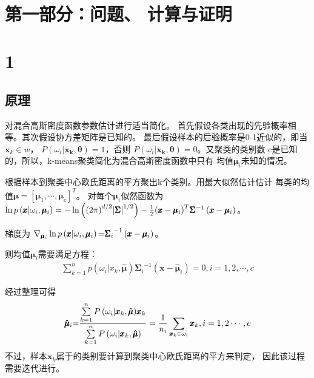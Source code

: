 \documentclass{article}
\title{
    \vspace{2in}
    \textmd{\textbf{\courseName}}\\
    \textmd{\homeworkTitle}\\ %
    \vspace{0.1in}
    \large{\studentName}\\
    \large{\studentId}\\
    \vspace{3in}
}
\begin{document}
\maketitle
\date{}
\pagebreak

\section*{第一部分：问题、 计算与证明}
\section*{1}
\subsection*{原理}
对混合高斯密度函数参数估计进行适当简化。
首先假设各类出现的先验概率相等。其次假设协方差矩阵是已知的。
最后假设样本的后验概率是0-1近似的，即当${\pmb{x}_k} \in w$，
$P\left( {{\omega_i}|\pmb{\pmb{x}_k},\pmb{\theta} } \right) = 1$，否则
$P\left( {{\omega_i}|\pmb{\pmb{x}_k},\pmb{\theta} } \right) = 0$。又聚类的类别数
c是已知的，所以，k-means聚类简化为混合高斯密度函数中只有
均值${\pmb{\mu} _i}$未知的情况。

根据样本到聚类中心欧氏距离的平方聚出k个类别。用最大似然估计估计
每类的均值$\pmb{\mu}  = {\left[ {{\pmb{\mu} _1}, \cdots ,{\pmb{\mu} _c}} \right]^T}$。
对每个${\pmb{\mu} _i}$似然函数为
$\ln p\left( {\pmb{x}|{\omega_i},{\pmb{\mu} _i}} \right) =  
- \ln \left( {{{\left( {2\pi } \right)}^{d/2}}{{\left| \pmb{\Sigma}  \right|}^{1/2}}} 
\right) - {1 \over 2}{\left( {\pmb{x} - {\pmb{\mu} _i}} \right)^T}{\pmb{\Sigma} ^{ - 1}}
\left( {\pmb{x} - {\pmb{\mu} _i}} \right)$。

梯度为
${\nabla _{{\pmb{\mu} _i}}}\ln p\left( {\pmb{x}|{\omega_i},{\pmb{\mu} _i}} \right)
{\rm{ = }}{\pmb{\Sigma} _i}^{ - 1}\left( {\pmb{x} - {\pmb{\mu} _i}} \right)$。

则均值${\pmb{\mu} _i}$需要满足方程：
\begin{align*}
	\sum\limits_{k = 1}^n 
	{p\left( {{\omega _i}|{x_k},\pmb{\hat \mu} } \right)} {\pmb{\Sigma} _i}^{ - 1}
	\left( {\pmb{x} - {\pmb{\hat \mu }_i}} \right) = 0,i = 1,2, \cdots, c
\end{align*}

经过整理可得
\begin{align*}
	{\pmb{\hat \mu }_i}{\rm{ = }}
	{{\sum\limits_{k = 1}^n {P\left( {{\omega _i}|{\pmb{x}_k},\pmb{\hat \mu} } \right)} {\pmb{x}_k}} 
	\over {\sum\limits_{k = 1}^n {P\left( {{\omega _i}|{\pmb{x}_k},\pmb{\hat \mu} } \right)} }} 
	= {1 \over {{n_i}}}\sum\limits_{{\pmb{x}_k} \in {\omega _i}} {{\pmb{x}_k}} ,i = 1,2 \cdots, c
\end{align*}
不过，样本${\pmb{x}_k}$属于的类别要计算到聚类中心欧氏距离的平方来判定，
因此该过程需要迭代进行。
\end{document}
